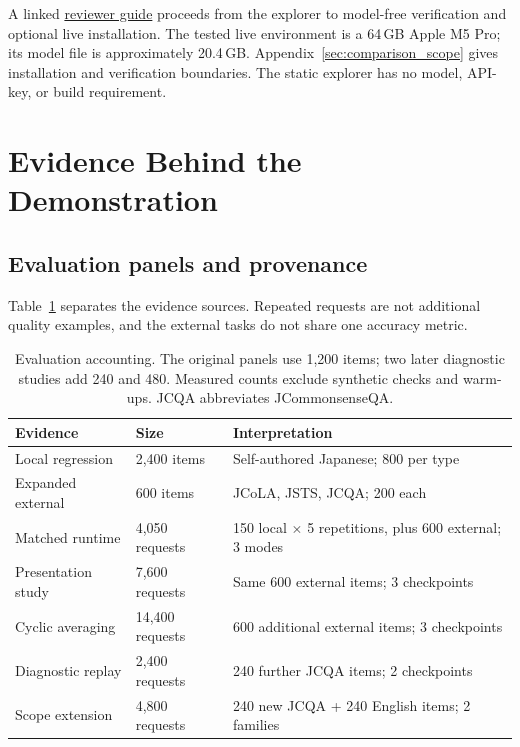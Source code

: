 \documentclass[11pt]{article}
\begin{document}
A linked \href{https://github.com/UpHash-Network/mini-jev/blob/research/naacl2027-demo/paper/naacl2027/reviewer_20261002/README.md}{reviewer guide} proceeds from the explorer to model-free verification and optional live installation. The tested live environment is a 64\,GB Apple M5 Pro; its model file is approximately 20.4\,GB. Appendix~\ref{sec:comparison_scope} gives installation and verification boundaries. The static explorer has no model, API-key, or build requirement.

\section{Evidence Behind the Demonstration}
\label{sec:evidence}
\subsection{Evaluation panels and provenance}
Table~\ref{tab:sets} separates the evidence sources. Repeated requests are not additional quality examples, and the external tasks do not share one accuracy metric.

\begin{table}[t]
\centering
\small
\setlength{\tabcolsep}{3pt}
\begin{tabular}{@{}p{1.72cm}p{1.44cm}p{4.08cm}@{}}
\toprule
Evidence & Size & Interpretation \\
\midrule
Local regression & 2,400 items & Self-authored Japanese; 800 per type \\
Expanded external & 600 items & JCoLA, JSTS, JCQA; 200 each \\
Matched runtime & 4,050 requests & 150 local $\times$ 5 repetitions, plus 600 external; 3 modes \\
Presentation study & 7,600 requests & Same 600 external items; 3 checkpoints \\
Cyclic averaging & 14,400 requests & 600 additional external items; 3 checkpoints \\
Diagnostic replay & 2,400 requests & 240 further JCQA items; 2 checkpoints \\
Scope extension & 4,800 requests & 240 new JCQA + 240 English items; 2 families \\
\bottomrule
\end{tabular}
\caption{Evaluation accounting. The original panels use 1,200 items; two later diagnostic studies add 240 and 480. Measured counts exclude synthetic checks and warm-ups. JCQA abbreviates JCommonsenseQA.}
\label{tab:sets}
\end{table}
\end{document}

